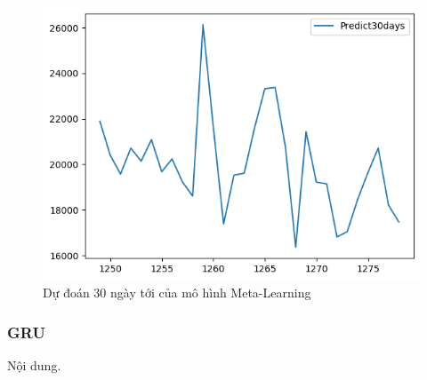\begin{figure}[H]
\begin{minipage}{0.15\textwidth}
    \includegraphics[width=1\textwidth]{resources/chapter-5/predicted/EXB_ML_9_1_next30days.png}
    \end{minipage}
    \hfill
    
    \caption{Dự đoán 30 ngày tới của mô hình Meta-Learning}
    \label{fig:ml_predicted}
\end{figure}




\subsubsection{GRU}
Nội dung.




